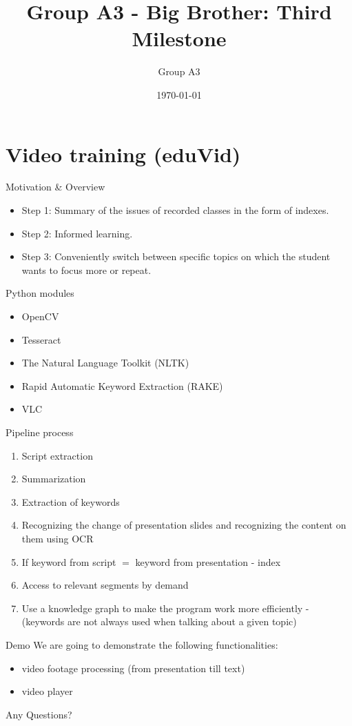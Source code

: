 \documentclass[xcolor=x11names,table]{beamer}
\title[\textcolor{white}{Third Milestone}]
{Group A3 - Big Brother: Third Milestone}
\author{Group A3}
\institute[TU Berlin]{TU Berlin}
\date{\today}
\begin{document}
\begin{frame}
\titlepage
\end{frame}


\section{Video training (eduVid)}

\begin{frame}{Motivation \& Overview}
\begin{itemize}
    \item Step 1: Summary of the issues of recorded classes in the form of
    indexes.
    \item Step 2: Informed learning.
    \item Step 3: Conveniently switch between specific topics on 
    which the student wants to focus more or repeat.
\end{itemize}
\end{frame}

\begin{frame}{Python modules}
\begin{itemize}
    \item OpenCV
    \item Tesseract
    \item The Natural Language Toolkit (NLTK)
    \item Rapid Automatic Keyword Extraction (RAKE)
    \item VLC
\end{itemize}
\end{frame}

\begin{frame}{Pipeline process}
\begin{enumerate}
    \item Script extraction
    \item Summarization
    \item Extraction of keywords
    \item Recognizing the change of presentation slides and recognizing
    the content on them using OCR
    \item If keyword from script $=$ keyword from presentation -
    index
    \item Access to relevant segments by demand
    \item Use a knowledge graph to make the program work more efficiently
    - (keywords are not always used when talking about a given topic)
\end{enumerate}
\end{frame}

\begin{frame}{Demo}
We are going to demonstrate the following functionalities:
\begin{itemize}
    \item video footage processing (from presentation till text)
    \item video player
\end{itemize}
\end{frame}

\begin{frame}{Any Questions?}
\end{frame}
\end{document}
